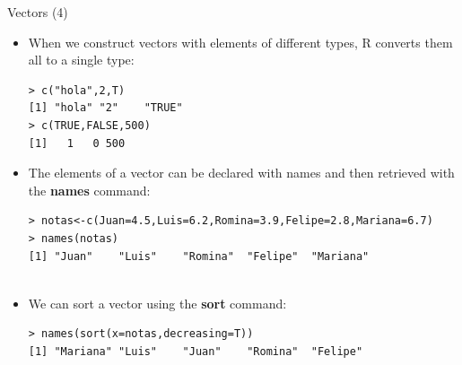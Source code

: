 \documentclass[handout]{beamer}
\begin{document}
 
\begin{frame}[fragile]{Vectors (4)}
\scriptsize{
\begin{itemize}
 
\item When we construct vectors with elements of different types, R converts them all to a single type:
\begin{verbatim}
> c("hola",2,T)
[1] "hola" "2"    "TRUE"
> c(TRUE,FALSE,500)
[1]   1   0 500 
\end{verbatim}

 \item The elements of a vector can be declared with names and then retrieved with the \textbf{names} command:
\begin{verbatim}
> notas<-c(Juan=4.5,Luis=6.2,Romina=3.9,Felipe=2.8,Mariana=6.7)
> names(notas)
[1] "Juan"    "Luis"    "Romina"  "Felipe"  "Mariana"
 
\end{verbatim}
\item We can sort a vector using the \textbf{sort} command:
\begin{verbatim}
> names(sort(x=notas,decreasing=T))
[1] "Mariana" "Luis"    "Juan"    "Romina"  "Felipe" 
\end{verbatim}

\end{itemize}



}
\end{frame}
\end{document}
